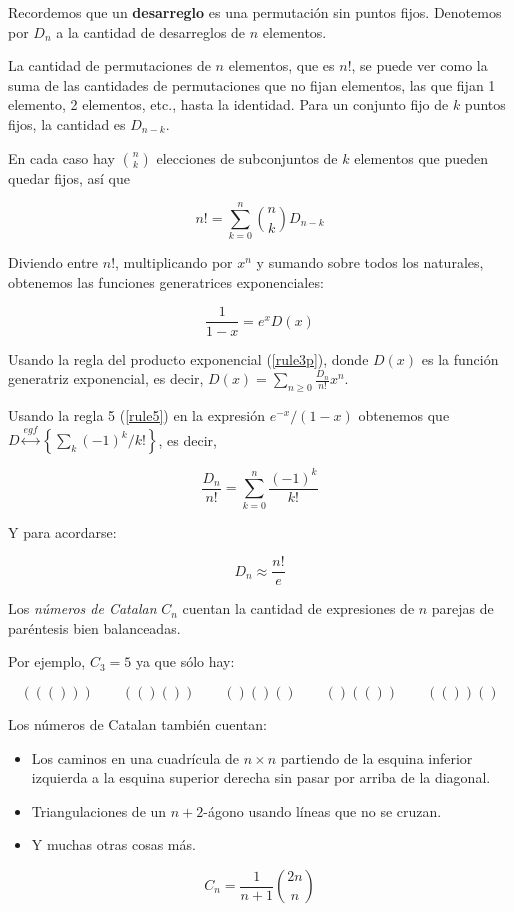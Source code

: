 \begin{example}
\label{example-combi-004}
Recordemos que un \textbf{desarreglo} es una
permutación sin puntos fijos. Denotemos por
$D_n$ a la cantidad de desarreglos de $n$
elementos.

La cantidad de permutaciones de $n$
elementos, que es $n!$, se puede ver como la
suma de las cantidades de permutaciones que
no fijan elementos, las que fijan 1 elemento,
2 elementos, etc., hasta la identidad. Para
un conjunto fijo de $k$ puntos fijos, la
cantidad es $D_{n-k}$.

En cada caso hay ${n \choose k}$ elecciones
de subconjuntos de $k$ elementos que pueden
quedar fijos, así que

$$
n!=\sum_{k=0}^n{n\choose k}D_{n-k}
$$

Diviendo entre $n!$, multiplicando por $x^n$
y sumando sobre todos los naturales,
obtenemos las funciones generatrices
exponenciales:

$$
\frac{1}{1-x}=e^xD(x)
$$

Usando la regla del
producto exponencial (\ref{rule3p}), donde
$D(x)$ es la
función generatriz exponencial, es decir,
$D(x) =  \sum_{n\geq0} \frac{D_n}{n!}x^n$.

Usando la regla 5 (\ref{rule5}) en la
expresión $e^{-x}/(1-x)$ obtenemos que
$D
\overset{egf}{\longleftrightarrow} \left\{
\sum_k(-1)^k/k! \right\}$, es decir,

$$
\frac{D_n}{n!}=\sum_{k=0}^n\frac{(-1)^k}{k!}
$$

Y para acordarse:

$$
D_n\approx \frac{n!}{e}
$$

\end{example}
\begin{definition}
\label{definition-combi-011}
Los \emph{números de Catalan} $C_n$ cuentan
la cantidad de expresiones de $n$ parejas de
paréntesis bien balanceadas.
\end{definition}
Por ejemplo, $C_3=5$ ya que sólo hay:

$$
((())) \qquad(()()) \qquad()()() \qquad()(())
\qquad(())()
$$

Los números de Catalan también cuentan:
\begin{itemize}
\item Los caminos en una cuadrícula de
$n\times n$ partiendo de la esquina inferior
izquierda a la esquina superior derecha sin
pasar por arriba de la diagonal.
\item Triangulaciones de un $n + 2$-ágono
usando líneas que no se cruzan.
\item Y muchas otras cosas más.
\end{itemize}
\begin{theorem}
\label{theorem-combi-005}

$$
C_n=\frac{1}{n+1}{2n\choose n}
$$

\end{theorem}

